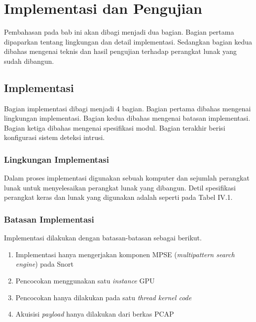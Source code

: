 
\chapter{Implementasi dan Pengujian}

Pembahasan pada bab ini akan dibagi menjadi dua bagian. Bagian pertama dipaparkan tentang lingkungan dan detail implementasi. Sedangkan bagian kedua dibahas mengenai teknis dan hasil pengujian terhadap perangkat lunak yang sudah dibangun.

\section{Implementasi}

  Bagian implementasi dibagi menjadi 4 bagian. Bagian pertama dibahas mengenai lingkungan implementasi. Bagian kedua dibahas mengenai batasan implementasi. Bagian ketiga dibahas mengenai spesifikasi modul. Bagian terakhir berisi konfigurasi sistem deteksi intrusi.

  \subsection{Lingkungan Implementasi}

    Dalam proses implementasi digunakan sebuah komputer dan sejumlah perangkat lunak untuk menyelesaikan perangkat lunak yang dibangun. Detil spesifikasi perangkat keras dan lunak yang digunakan adalah seperti pada Tabel IV.1.
    
    

  \subsection{Batasan Implementasi}

    Implementasi dilakukan dengan batasan-batasan sebagai berikut.

    \begin{enumerate}

      \item Implementasi hanya mengerjakan komponen MPSE (\emph{multipattern search engine}) pada Snort

      \item Pencocokan menggunakan satu \emph{instance} GPU
    
      \item Pencocokan hanya dilakukan pada satu \emph{thread kernel code}
    
      \item Akuisisi \emph{payload} hanya dilakukan dari berkas PCAP

    \end{enumerate}


